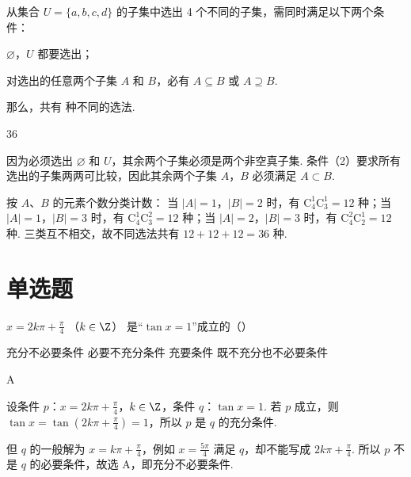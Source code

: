 \begin{problem}
从集合 \(U = \{a, b, c, d\}\) 的子集中选出 4 个不同的子集，需同时满足以下两个条件：

\begin{circlelist}
\item \(\varnothing\)，\(U\) 都要选出；
\item 对选出的任意两个子集 \(A\) 和 \(B\)，必有 \(A \subseteq B\) 或 \(A \supseteq B\).
\end{circlelist}

那么，共有\fillinblank{} 种不同的选法.
\end{problem}

\begin{answer}
36
\end{answer}

\begin{solution}
因为必须选出 \(\varnothing\) 和 \(U\)，其余两个子集必须是两个非空真子集. 条件（2）要求所有选出的子集两两可比较，因此其余两个子集 \(A\)，\(B\) 必须满足 \(A\subset B\).

按 \(A\)、\(B\) 的元素个数分类计数：
当 \(|A|=1\)，\(|B|=2\) 时，有 \(\mathrm C_4^1\mathrm C_3^1=12\) 种；当 \(|A|=1\)，\(|B|=3\) 时，有 \(\mathrm C_4^1\mathrm C_3^2=12\) 种；当 \(|A|=2\)，\(|B|=3\) 时，有 \(\mathrm C_4^2\mathrm C_2^1=12\) 种.
三类互不相交，故不同选法共有 \(12+12+12=36\) 种.
\end{solution}

\section{单选题}

\begin{problem}
\(x = 2k\pi + \frac{\pi}{4}\) （\(k \in \Z\)） 是“\(\tan x = 1\)”成立的（\quad）

\choices
    {充分不必要条件}
    {必要不充分条件}
    {充要条件}
    {既不充分也不必要条件}

\begin{answer}
A
\end{answer}

\begin{solution}
设条件 \(p\)：\(x=2k\pi+\frac{\pi}{4}\)，\(k\in\Z\)，条件 \(q\)：\(\tan x=1\). 若 \(p\) 成立，则
\(\tan x=\tan\left(2k\pi+\frac{\pi}{4}\right)=1\)，所以 \(p\) 是 \(q\) 的充分条件.

但 \(q\) 的一般解为 \(x=k\pi+\frac{\pi}{4}\)，例如 \(x=\frac{5\pi}{4}\) 满足 \(q\)，却不能写成 \(2k\pi+\frac{\pi}{4}\). 所以 \(p\) 不是 \(q\) 的必要条件，故选 A，即充分不必要条件.
\end{solution}
\end{problem}

